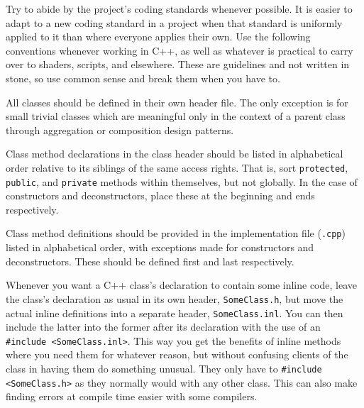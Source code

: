

Try to abide by the project's coding standards whenever possible. It is easier to adapt to a new coding standard in a project when that standard is uniformly applied to it than where everyone applies their own. Use the following conventions whenever working in C++, as well as whatever is practical to carry over to shaders, scripts, and elsewhere. These are guidelines and not written in stone, so use common sense and break them when you have to.


\startitemize[4]
\item
All classes should be defined in their own header file. The only exception is for small trivial classes which are meaningful only in the context of a parent class through aggregation or composition design patterns.

\item
Class method declarations in the class header should be listed in alphabetical order relative to its siblings of the same access rights. That is, sort {\tt protected}, {\tt public}, and {\tt private} methods within themselves, but not globally. In the case of constructors and deconstructors, place these at the beginning and ends respectively.

\item
Class method definitions should be provided in the implementation file ({\tt *.cpp}) listed in alphabetical order, with exceptions made for constructors and deconstructors. These should be defined first and last respectively.

\item
Whenever you want a C++ class's declaration to contain some inline code, leave the class's declaration as usual in its own header, {\tt SomeClass.h}, but move the actual inline definitions into a separate header, {\tt SomeClass.inl}. You can then include the latter into the former after its declaration with the use of an {\tt \#include <SomeClass.inl>}. This way you get the benefits of inline methods where you need them for whatever reason, but without confusing clients of the class in having them do something unusual. They only have to {\tt \#include <SomeClass.h>} as they normally would with any other class. This can also make finding errors at compile time easier with some compilers.
\stopitemize

